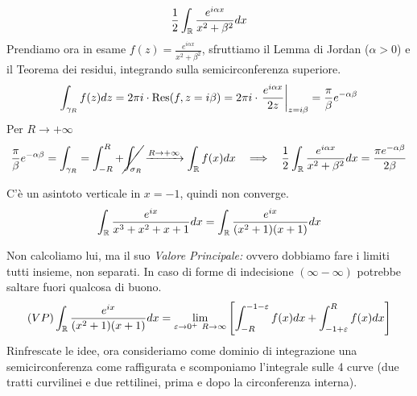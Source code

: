 \begin{equation*}
\frac{1}{2}\int_{\mathbb{R}}\frac{e^{i\alpha x}}{x^{2} + \beta^{2}} dx
\end{equation*}Prendiamo ora in esame $f(z) = \frac{e^{i\alpha x}}{x^{2} + \beta^{2}}$, sfruttiamo il Lemma di Jordan ($\alpha  > 0$) e il Teorema dei residui, integrando sulla semicirconferenza superiore.
\begin{equation*}
\int_{\gamma_{R}} f(z) dz = 2\pi i \cdot \operatorname{Res} (f, z = i\beta) = 2\pi i \cdot \left. \frac{e^{i\alpha x}}{2z}\right|_{z = i\beta} = \frac{\pi}{\beta} e^{- \alpha \beta}
\end{equation*}
Per $R\rightarrow + \infty $
\begin{equation*}
\frac{\pi}{\beta} e^{- \alpha \beta} = \int_{\gamma_{R}} = \int^{R}_{- R} + \cancel{\int_{\sigma_{R}}}\xrightarrow{R\rightarrow + \infty}\int_{\mathbb{R}} f(x) dx\ \ \implies \ \ \frac{1}{2}\int_{\mathbb{R}}\frac{e^{i\alpha x}}{x^{2} + \beta^{2}} dx = \frac{\pi e^{- \alpha \beta}}{2\beta}
\end{equation*}
\Soluzione

C'è un asintoto verticale in $x = -1$, quindi non converge.
\begin{equation*}
\int_{\mathbb{R}}\frac{e^{ix}}{x^{3} + x^{2} + x + 1} dx = \int_{\mathbb{R}}\frac{e^{ix}}{(x^{2} + 1)(x + 1)} dx
\end{equation*}

Non calcoliamo lui, ma il suo \textit{Valore Principale:} ovvero dobbiamo fare i limiti tutti insieme, non separati. In caso di forme di indecisione $(\infty - \infty)$ potrebbe saltare fuori qualcosa di buono.
\begin{equation*}
(VP)\int_{\mathbb{R}}\frac{e^{ix}}{(x^{2} + 1)(x + 1)} dx = \lim_{\varepsilon \rightarrow 0^{+} \ R\rightarrow \infty}\left[\int^{- 1 - \varepsilon}_{- R} f(x)dx + \int^{R}_{- 1 + \varepsilon} f(x)dx\right]
\end{equation*}
Rinfrescate le idee, ora consideriamo come dominio di integrazione una semicirconferenza come raffigurata e scomponiamo l'integrale sulle 4 curve (due tratti curvilinei e due rettilinei, prima e dopo la circonferenza interna).


